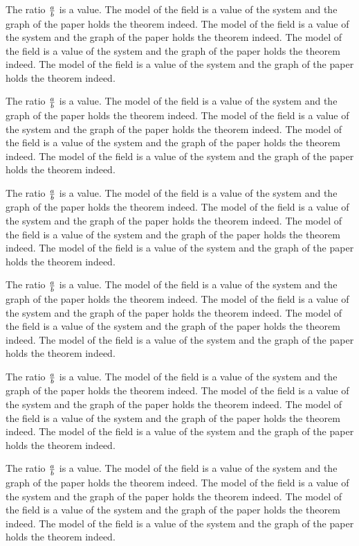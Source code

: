 \documentclass{article}
\let\primover\over
\def\over{+}
\begin{document}
\let\over\primover

The ratio ${a \over b}$ is a value.
The model of the field is a value of the system and the graph of the paper holds the theorem indeed. The model of the field is a value of the system and the graph of the paper holds the theorem indeed. The model of the field is a value of the system and the graph of the paper holds the theorem indeed. The model of the field is a value of the system and the graph of the paper holds the theorem indeed.

The ratio ${a \over b}$ is a value.
The model of the field is a value of the system and the graph of the paper holds the theorem indeed. The model of the field is a value of the system and the graph of the paper holds the theorem indeed. The model of the field is a value of the system and the graph of the paper holds the theorem indeed. The model of the field is a value of the system and the graph of the paper holds the theorem indeed.

The ratio ${a \over b}$ is a value.
The model of the field is a value of the system and the graph of the paper holds the theorem indeed. The model of the field is a value of the system and the graph of the paper holds the theorem indeed. The model of the field is a value of the system and the graph of the paper holds the theorem indeed. The model of the field is a value of the system and the graph of the paper holds the theorem indeed.

The ratio ${a \over b}$ is a value.
The model of the field is a value of the system and the graph of the paper holds the theorem indeed. The model of the field is a value of the system and the graph of the paper holds the theorem indeed. The model of the field is a value of the system and the graph of the paper holds the theorem indeed. The model of the field is a value of the system and the graph of the paper holds the theorem indeed.

The ratio ${a \over b}$ is a value.
The model of the field is a value of the system and the graph of the paper holds the theorem indeed. The model of the field is a value of the system and the graph of the paper holds the theorem indeed. The model of the field is a value of the system and the graph of the paper holds the theorem indeed. The model of the field is a value of the system and the graph of the paper holds the theorem indeed.

The ratio ${a \over b}$ is a value.
The model of the field is a value of the system and the graph of the paper holds the theorem indeed. The model of the field is a value of the system and the graph of the paper holds the theorem indeed. The model of the field is a value of the system and the graph of the paper holds the theorem indeed. The model of the field is a value of the system and the graph of the paper holds the theorem indeed.
\end{document}
